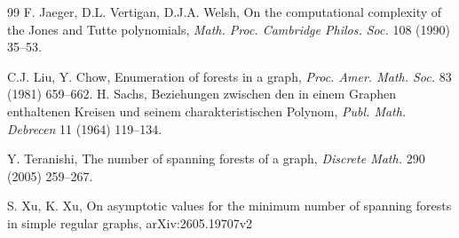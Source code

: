 \documentclass[11pt, a4paper]{article}
\begin{document}
\begin{thebibliography}{99}
F. Jaeger, D.L. Vertigan, D.J.A. Welsh, On the computational complexity of the Jones and Tutte polynomials,  {\em Math. Proc. Cambridge Philos. Soc. } 108 (1990) 35--53.

C.J. Liu, Y. Chow, Enumeration of forests in a graph,  {\em Proc. Amer. Math. Soc. } 83 (1981) 659--662.
H. Sachs, Beziehungen zwischen den in einem Graphen enthaltenen Kreisen und seinem charakteristischen Polynom,  {\em Publ. Math. Debrecen }11 (1964) 119--134.

Y. Teranishi, The number of spanning forests of a graph, {\em Discrete Math. } 290 (2005) 259--267.

S. Xu, K. Xu, On asymptotic values for the minimum number of spanning
forests in simple regular graphs,  arXiv:2605.19707v2


\date{}


\end{thebibliography}
\end{document}

